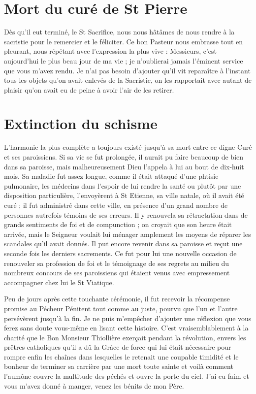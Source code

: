 \documentclass[11pt,a4paper]{report}
\begin{document}
\section*{Mort du curé de St Pierre}

Dès qu'il eut terminé, le St Sacrifice, nous nous hâtâmes de nous rendre à la sacristie pour le remercier et le féliciter. Ce bon Pasteur nous embrasse tout en pleurant, nous répétant avec l'expression la plus vive : Messieurs, c'est aujourd'hui le plus beau jour de ma vie ; je n'oublierai jamais l'éminent service que vous m'avez rendu. Je n'ai pas besoin d'ajouter qu'il vit reparaître à l'instant tous les objets qu'on avait enlevés de la Sacristie, on les rapportait avec autant de plaisir qu'on avait eu de peine à avoir l'air de les retirer.

\section*{Extinction du schisme}

L'harmonie la plus complète a toujours existé jusqu'à sa mort entre ce digne Curé et ses paroissiens. Si sa vie se fut prolongée, il aurait pu faire beaucoup de bien dans sa paroisse, mais malheureusement Dieu l'appela à lui au bout de dix-huit mois. Sa maladie fut assez longue, comme il était attaqué d'une phtisie pulmonaire, les médecins dans l'espoir de lui rendre la santé ou plutôt par une disposition particulière, l'envoyèrent à St Etienne, sa ville natale, où il avait été curé ; il fut administré dans cette ville, en présence d'un grand nombre de personnes autrefois témoins de ses erreurs. Il y renouvela sa rétractation dans de grands sentiments de foi et de compunction ; on croyait que son heure était arrivée, mais le Seigneur voulait lui ménager amplement les moyens de réparer les scandales qu'il avait donnés. Il put encore revenir dans sa paroisse et reçut une seconde fois les derniers sacrements. Ce fut pour lui une nouvelle occasion de renouveler sa profession de foi et le témoignage de ses regrets au milieu du nombreux concours de ses paroissiens qui étaient venus avec empressement accompagner chez lui le St Viatique.

Peu de jours après cette touchante cérémonie, il fut recevoir la récompense promise au Pécheur Pénitent tout comme au juste, pourvu que l'un et l'autre persévèrent jusqu'à la fin. Je ne puis m'empêcher d'ajouter une réflexion que vous ferez sans doute vous-même en lisant cette histoire. C'est vraisemblablement à la charité que le Bon Monsieur Thiollière exerçait pendant la révolution, envers les prêtres catholiques qu'il a dû la Grâce de force qui lui était nécessaire pour rompre enfin les chaînes dans lesquelles le retenait une coupable timidité et le bonheur de terminer sa carrière par une mort toute sainte et voilà comment l'aumône couvre la multitude des péchés et ouvre la porte du ciel. J'ai eu faim et vous m'avez donné à manger, venez les bénits de mon Père.
\end{document}
